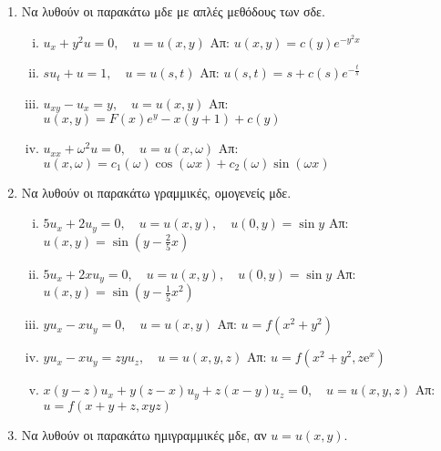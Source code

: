 



\thispagestyle{askhseis}



\begin{center}
  \minibox{\large\bfseries \textcolor{Col1}{ΜΔΕ 1ης τάξης}}
\end{center}

\vspace{\baselineskip}

\begin{enumerate}
  \item Να λυθούν οι παρακάτω μδε με απλές μεθόδους των σδε.
    \begin{enumerate}[i)]
      \item $u_{x}+y^{2}u=0,\quad u=u(x,y)$ \hfill Απ: $u(x,y)=c(y)e^{-y^{2}x}$
      \item $su_{t}+u=1,\quad u=u(s,t)$ \hfill Απ: $u(s,t)=s+c(s)e^{-\frac{t}{s}}$
      \item $u_{xy}-u_{x}=y,\quad u=u(x,y)$ \hfill Απ: $u(x,y)=F(x)e^{y}-x(y+1)+c(y)$
      \item $u_{xx}+\omega^{2}u=0,\quad u=u(x,\omega)$ 
        \hfill Απ: $u(x,\omega)=c_{1}(\omega)\cos(\omega x)+c_{2}(\omega)\sin(\omega x)$
    \end{enumerate}

  \item Να λυθούν οι παρακάτω γραμμικές, ομογενείς μδε.

    \begin{enumerate}[i)]
      \item $5u_{x}+2u_{y}=0,\quad  u=u(x,y) ,\quad u(0,y)=\sin y$ 
        \hfill Απ: $u(x,y)=\sin(y-\frac{2}{5}x)$
      \item $5u_{x}+2xu_{y}=0,\quad  u=u(x,y) ,\quad u(0,y)=\sin y$ 
        \hfill Απ: $u(x,y)=\sin(y-\frac{1}{5}x^{2})$ 
      \item $yu_{x}-xu_{y}=0, \quad u=u(x,y)$ \hfill Απ: $u=f(x^{2}+y^{2})$ 
      \item $ yu_{x}-xu_{y}=zyu_{z}, \quad u=u(x,y,z) $ 
        \hfill Απ: $ u=f(x^{2}+y^{2}, z\mathrm{e}^{x}) $ 
      \item $x(y-z)u_{x}+y(z-x)u_{y}+z(x-y)u_{z}=0, \quad u=u(x,y,z) $ 
        \hfill Απ: $u=f(x+y+z,xyz)$
    \end{enumerate}

  \item Να λυθούν οι παρακάτω ημιγραμμικές μδε, αν $u=u(x,y)$.


\end{enumerate}
